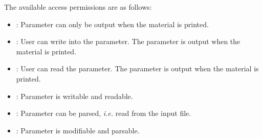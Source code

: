 The available access permissions are as follows:
\begin{itemize}
  \item {}: Parameter can only be output when the material is printed.
  \item {}: User can write into the parameter. The parameter is output when the material is printed.
  \item {}: User can read the parameter. The parameter is output when the material is printed.
  \item {}: Parameter is writable and readable.
  \item {}: Parameter can be parsed, \textit{i.e.} read from the input file.
  \item {}: Parameter is modifiable and parsable.
\end{itemize}

